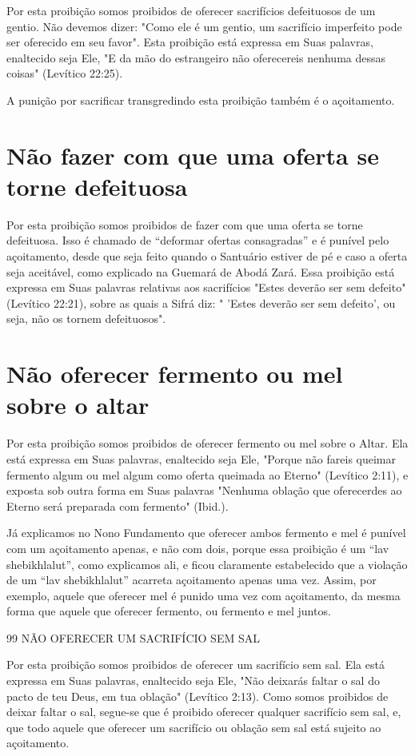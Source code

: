 Por esta proibição somos proibidos de oferecer sacrifícios defeituo­sos
de um gentio. Não devemos dizer: "Como ele é um gentio, um sacrifício
imperfeito pode ser oferecido em seu favor". Esta proibição está
expressa em Suas palavras, enaltecido seja Ele, "E da mão do estrangeiro
não oferecereis ne­nhuma dessas coisas" (Levítico 22:25).

A punição por sacrificar transgredindo esta proibição também é o
açoitamento.

\section{Não fazer com que uma oferta se torne defeituosa}

Por esta proibição somos proibidos de fazer com que uma oferta se torne
defeituosa. Isso é chamado de ``deformar ofertas consagradas'' e é
puní­vel pelo açoitamento, desde que seja feito quando o Santuário
estiver de pé e caso a oferta seja aceitável, como explicado na Guemará
de Abodá Zará. Essa proibição está expressa em Suas palavras relativas
aos sacrifícios "Estes deve­rão ser sem defeito" (Levítico 22:21), sobre
as quais a Sifrá diz: " 'Estes deve­rão ser sem defeito', ou seja, não
os tornem defeituosos".

\section{Não oferecer fermento ou mel sobre o altar}

Por esta proibição somos proibidos de oferecer fermento ou mel so­bre o
Altar. Ela está expressa em Suas palavras, enaltecido seja Ele, "Porque
não fareis queimar fermento algum ou mel algum como oferta queimada ao
Eter­no" (Levítico 2:11), e exposta sob outra forma em Suas palavras
"Nenhuma obla­ção que oferecerdes ao Eterno será preparada com fermento"
(Ibid.).

Já explicamos no Nono Fundamento que oferecer ambos fermento e mel é
punível com um açoitamento apenas, e não com dois, porque essa
proi­bição é um ``lav shebikhlalut'', como explicamos ali, e ficou
claramente estabe­lecido que a violação de um ``lav shebikhlalut''
acarreta açoitamento apenas uma vez. Assim, por exemplo, aquele que
oferecer mel é punido uma vez com açoitamento, da mesma forma que aquele
que oferecer fermento, ou fermento e mel juntos.

99 NÃO OFERECER UM SACRIFÍCIO SEM SAL

Por esta proibição somos proibidos de oferecer um sacrifício sem sal.
Ela está expressa em Suas palavras, enaltecido seja Ele, "Não deixarás
faltar o sal do pacto de teu Deus, em tua oblação" (Levítico 2:13). Como
somos proi­bidos de deixar faltar o sal, segue-se que é proibido
oferecer qualquer sacrifício sem sal, e, que todo aquele que oferecer um
sacrifício ou oblação sem sal está sujeito ao açoitamento.


